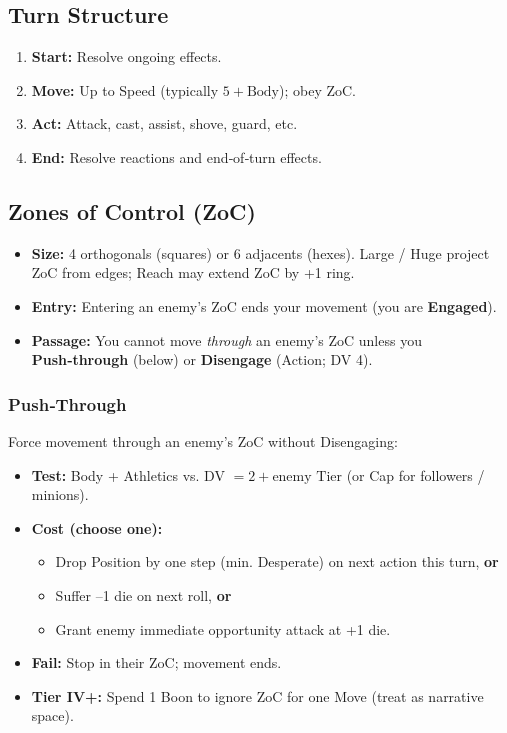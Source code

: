 \subsection{Turn Structure}
\begin{enumerate}[nosep]
    \item \textbf{Start:} Resolve ongoing effects.
    \item \textbf{Move:} Up to Speed (typically \(5 + \text{Body}\)); obey ZoC.
    \item \textbf{Act:} Attack, cast, assist, shove, guard, etc.
    \item \textbf{End:} Resolve reactions and end‑of‑turn effects.
\end{enumerate}

\subsection{Zones of Control (ZoC)}\label{subsec:zoc}
\begin{itemize}[nosep]
    \item \textbf{Size:} 4 orthogonals (squares) or 6 adjacents (hexes). Large / Huge project ZoC from edges; Reach may extend ZoC by +1 ring.
    \item \textbf{Entry:} Entering an enemy's ZoC ends your movement (you are \textbf{Engaged}).
    \item \textbf{Passage:} You cannot move \textit{through} an enemy's ZoC unless you \textbf{Push‑through} (below) or \textbf{Disengage} (Action; DV 4).
\end{itemize}

\subsubsection*{Push‑Through}
Force movement through an enemy's ZoC without Disengaging:
\begin{itemize}[nosep]
    \item \textbf{Test:} Body + Athletics vs. DV \(= 2 + \text{enemy Tier}\) (or Cap for followers / minions).
    \item \textbf{Cost (choose one):}
        \begin{itemize}[nosep,label=$\bullet$]
            \item Drop Position by one step (min. Desperate) on next action this turn, \textbf{or}
            \item Suffer --1 die on next roll, \textbf{or}
            \item Grant enemy immediate opportunity attack at +1 die.
        \end{itemize}
    \item \textbf{Fail:} Stop in their ZoC; movement ends.
    \item \textbf{Tier IV+:} Spend 1 Boon to ignore ZoC for one Move (treat as narrative space).
\end{itemize}

